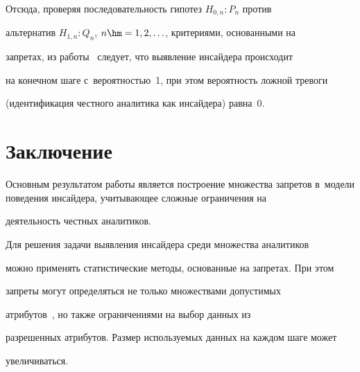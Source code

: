   


  Отсюда, проверяя последовательность гипотез $H_{0,n}: P_n$ против 


альтернатив $H_{1,n}: Q_n$, $n\hm = 1, 2,\ldots$, критериями, основанными на 


запретах, из работы~\cite{6-mar} следует, что выявление инсайдера происходит 


на конечном шаге с~вероятностью~1, при этом вероятность ложной тревоги 


(идентификация честного аналитика как инсайдера) равна~0.


    


    \section{Заключение}


    


     Основным результатом работы является построение множества запретов в~модели поведения инсайдера, учитывающее сложные ограничения на 


деятельность честных аналитиков. 


     


     Для решения задачи выявления инсайдера среди множества аналитиков 


можно применять статистические методы, основанные на запретах. При этом 


запреты могут определяться не только множествами допустимых 


атрибутов~\cite{1-mar}, но также ограничениями на выбор данных из 


разрешенных атрибутов. Размер исполь\-зу\-емых данных на каждом шаге может 


увеличиваться. 


     


